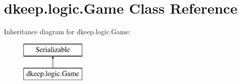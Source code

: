 \hypertarget{classdkeep_1_1logic_1_1_game}{}\section{dkeep.\+logic.\+Game Class Reference}
\label{classdkeep_1_1logic_1_1_game}
Inheritance diagram for dkeep.\+logic.\+Game\+:\begin{figure}[H]
\begin{center}
\leavevmode
\includegraphics[height=2.000000cm]{classdkeep_1_1logic_1_1_game}
\end{center}
\end{figure}
